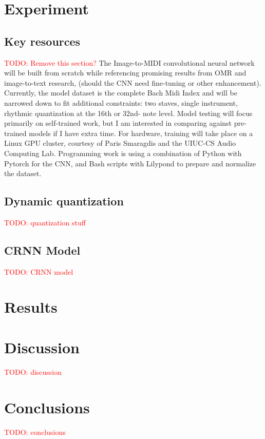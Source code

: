 \documentclass[review,sigconf]{acmart}
\newcommand{\todo}[1]{\textcolor{red}{TODO: #1}}
\begin{document}


\section{Experiment}
\subsection{Key resources}
\todo{Remove this section?}
The Image-to-MIDI convolutional neural network will be built from scratch while referencing promising results from OMR and image-to-text research, (should the CNN need fine-tuning or other enhancement). Currently, the model dataset is the complete Bach Midi Index and will be narrowed down to fit additional constraints: two staves, single instrument, rhythmic quantization at the 16th or 32nd- note level. Model testing will focus primarily on self-trained work, but I am interested in comparing against pre-trained models if I have extra time. For hardware, training will take place on a Linux GPU cluster, courtesy of Paris Smaragdis and the UIUC-CS Audio Computing Lab. Programming work is using a combination of Python with Pytorch for the CNN, and Bash scripts with Lilypond to prepare and normalize the dataset.

\subsection{Dynamic quantization}
\todo{quantization stuff}

\subsection{CRNN Model}
\todo{CRNN model}

\section{Results}

\section{Discussion}
\todo{discussion}

\section{Conclusions}
\todo{conclusions}



\end{document}
